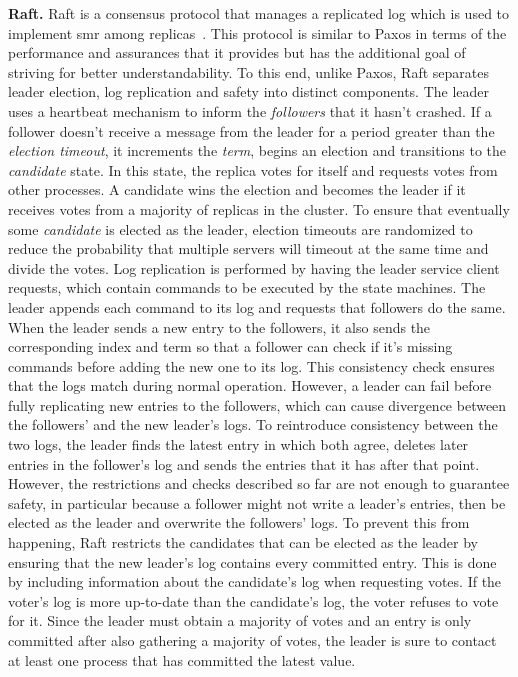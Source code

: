 \textbf{Raft.} Raft is a consensus protocol that manages a replicated log which is used to implement \acrshort{smr} among replicas~\cite{184040}. This protocol is similar to Paxos in terms of the performance and assurances that it provides but has the additional goal of striving for better understandability. To this end, unlike Paxos, Raft separates leader election, log replication and safety into distinct components. The leader uses a heartbeat mechanism to inform the \textit{followers} that it hasn't crashed. If a follower doesn't receive a message from the leader for a period greater than the \textit{election timeout}, it increments the \textit{term}, begins an election and transitions to the \textit{candidate} state. In this state, the replica votes for itself and requests votes from other processes. A candidate wins the election and becomes the leader if it receives votes from a majority of replicas in the cluster. To ensure that eventually some \textit{candidate} is elected as the leader, election timeouts are randomized to reduce the probability that multiple servers will timeout at the same time and divide the votes. Log replication is performed by having the leader service client requests, which contain commands to be executed by the state machines. The leader appends each command to its log and requests that followers do the same. When the leader sends a new entry to the followers, it also sends the corresponding index and term so that a follower can check if it's missing commands before adding the new one to its log. This consistency check ensures that the logs match during normal operation. However, a leader can fail before fully replicating new entries to the followers, which can cause divergence between the followers' and the new leader's logs. To reintroduce consistency between the two logs, the leader finds the latest entry in which both agree, deletes later entries in the follower's log and sends the entries that it has after that point. However, the restrictions and checks described so far are not enough to guarantee safety, in particular because a follower might not write a leader's entries, then be elected as the leader and overwrite the followers' logs. To prevent this from happening, Raft restricts the candidates that can be elected as the leader by ensuring that the new leader's log contains every committed entry. This is done by including information about the candidate's log when requesting votes. If the voter's log is more up-to-date than the candidate's log, the voter refuses to vote for it. Since the leader must obtain a majority of votes and an entry is only committed after also gathering a majority of votes, the leader is sure to contact at least one process that has committed the latest value. \par
